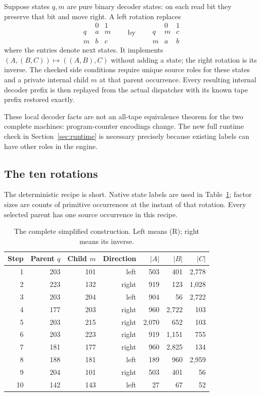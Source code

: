 \documentclass[11pt]{article}
\begin{document}
Suppose states $q,m$ are pure binary decoder states: on each read bit
they preserve that bit and move right. A left rotation replaces
\[
\begin{array}{c|cc}
 &0&1\\\hline
q&a&m\\m&b&c
\end{array}
\qquad\text{by}\qquad
\begin{array}{c|cc}
 &0&1\\\hline
q&m&c\\m&a&b
\end{array}
\tag{R}
\]
where the entries denote next states. It implements
$(A,(B,C))\mapsto((A,B),C)$ without adding a state; the right rotation
is its inverse. The checked side conditions require unique source roles
for these states and a private internal child $m$ at that parent
occurrence. Every resulting internal decoder prefix is then replayed
from the actual dispatcher with its known tape prefix restored exactly.

These local decoder facts are not an all-tape equivalence theorem for
the two complete machines: program-counter encodings change. The new
full runtime check in Section~\ref{sec:runtime} is necessary precisely
because existing labels can have other roles in the engine.

\subsection{The ten rotations}

The deterministic recipe is short. Native state labels are used in
Table~\ref{tab:recipe}; factor sizes are counts of primitive occurrences
at the instant of that rotation. Every selected parent has one source
occurrence in this recipe.

\begin{table}[htbp]
\centering
\begin{tabular}{rrrrrrr}
\toprule
Step & Parent $q$ & Child $m$ & Direction & $|A|$ & $|B|$ & $|C|$\\
\midrule
1&203&101&left &503&401&2,778\\
2&223&132&right&919&123&1,028\\
3&203&204&left &904&56&2,722\\
4&177&203&right&960&2,722&103\\
5&203&215&right&2,070&652&103\\
6&203&223&right&919&1,151&755\\
7&181&177&right&960&2,825&134\\
8&188&181&left &189&960&2,959\\
9&204&101&right&503&401&56\\
10&142&143&left&27&67&52\\
\bottomrule
\end{tabular}
\caption{The complete simplified construction. Left means (R); right means its inverse.}
\label{tab:recipe}
\end{table}
\end{document}
